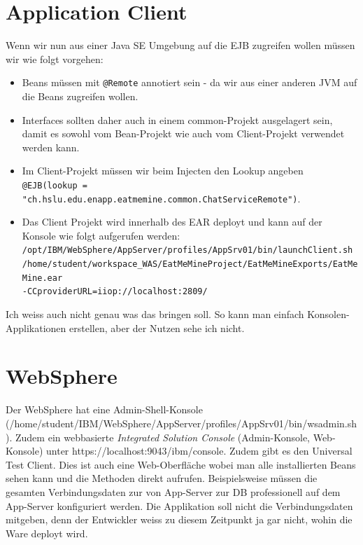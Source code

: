 \section{Application Client}
Wenn wir nun aus einer Java SE Umgebung auf die EJB zugreifen wollen müssen wir wie folgt vorgehen:
\begin{itemize}
	\item Beans müssen mit \verb|@Remote| annotiert sein - da wir aus einer anderen JVM auf die Beans zugreifen wollen.
	\item Interfaces sollten daher auch in einem common-Projekt ausgelagert sein, damit es sowohl vom Bean-Projekt wie auch vom Client-Projekt verwendet werden kann.
	\item Im Client-Projekt müssen wir beim Injecten den Lookup angeben \\ \verb|@EJB(lookup = "ch.hslu.edu.enapp.eatmemine.common.ChatServiceRemote")|.
	\item Das Client Projekt wird innerhalb des EAR deployt und kann auf der Konsole wie folgt aufgerufen werden:
	\verb|/opt/IBM/WebSphere/AppServer/profiles/AppSrv01/bin/launchClient.sh|\\
	\verb|/home/student/workspace_WAS/EatMeMineProject/EatMeMineExports/EatMeMine.ear|\\
	\verb|-CCproviderURL=iiop://localhost:2809/|
\end{itemize}

Ich weiss auch nicht genau was das bringen soll. So kann man einfach Konsolen-Applikationen erstellen, aber der Nutzen sehe ich nicht.

\section{WebSphere}
Der WebSphere hat eine Admin-Shell-Konsole (/home/student/IBM/WebSphere/AppServer/profiles/AppSrv01/bin/wsadmin.sh). Zudem ein webbasierte \emph{Integrated Solution Console}  (Admin-Konsole, Web-Konsole) unter https://localhost:9043/ibm/console. Zudem gibt es den Universal Test Client. Dies ist auch eine Web-Oberfläche wobei man alle installierten Beans sehen kann und die Methoden direkt aufrufen. Beispielsweise müssen die gesamten Verbindungsdaten zur von App-Server zur DB professionell auf dem App-Server konfiguriert werden. Die Applikation soll nicht die Verbindungsdaten mitgeben, denn der Entwickler weiss zu diesem Zeitpunkt ja gar nicht, wohin die Ware deployt wird.

